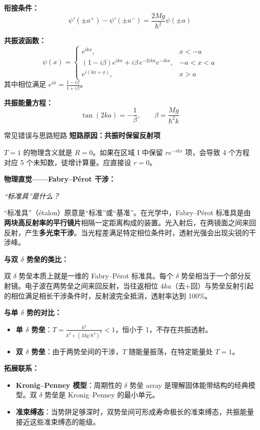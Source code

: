 \begin{formulabox}[核心结论]
\textbf{衔接条件：}
\[
\psi'(\pm a^+) - \psi'(\pm a^-) = \frac{2Mg}{\hbar^2}\psi(\pm a)
\]

\textbf{共振波函数：}
\[
\psi(x) = 
\begin{cases}
e^{ikx}, & x < -a \\
(1-i\beta)e^{ikx} + i\beta\,e^{-2ika}e^{-ikx}, & -a < x < a \\
e^{i(kx+\phi)}, & x > a
\end{cases}
\]
其中相位满足 $\displaystyle e^{i\phi}=\frac{1-i\beta}{1+i\beta}$。

\textbf{共振能量方程：}
\[
\boxed{\tan(2ka) = -\frac{1}{\beta}}, \qquad \beta = \frac{Mg}{\hbar^2 k}
\]
\end{formulabox}

\begin{errorbox}[colback=white]{常见错误与思路短路}
\textbf{短路原因：共振时保留反射项}

$T=1$ 的物理含义就是 $R=0$。如果在区域 I 中保留 $re^{-ikx}$ 项，会导致 4 个方程对应 5 个未知数，徒增计算量。应直接设 $r=0$。
\end{errorbox}

\begin{insightbox}[举一反三与物理直觉]
\textbf{物理直觉——Fabry--P\'erot 干涉：}

\textit{``标准具''是什么？}

``标准具''（\'{e}talon）原意是``标准''或``基准''。在光学中，Fabry--P\'erot 标准具是由\textbf{两块高反射率的平行镜片}相隔一定距离构成的装置。光入射后，在两镜面之间来回反射，产生\textbf{多光束干涉}。当光程差满足特定相位条件时，透射光强会出现尖锐的干涉峰。

\textbf{与双 $\delta$ 势垒的类比：}

双 $\delta$ 势垒本质上就是一维的 Fabry--P\'erot 标准具。每个 $\delta$ 势垒相当于一个部分反射镜。电子波在两势垒之间来回反射，当往返相位 $4ka$（去+回）与势垒反射引起的相位满足相长干涉条件时，反射波完全抵消，透射率达到 100\%。

\textbf{与单 $\delta$ 势的对比：}
\begin{itemize}[nosep]
    \item \textbf{单 $\delta$ 势垒}：$T = \frac{k^2}{k^2+(Mg/\hbar^2)^2} < 1$，恒小于 1，不存在共振透射。
    \item \textbf{双 $\delta$ 势垒}：由于两势垒间的干涉，$T$ 随能量振荡，在特定能量处 $T=1$。
\end{itemize}

\textbf{拓展联系：}
\begin{itemize}[nosep]
    \item \textbf{Kronig--Penney 模型}：周期性的 $\delta$ 势垒 array 是理解固体能带结构的经典模型。双 $\delta$ 势垒是 Kronig--Penney 的最小单元。
    \item \textbf{准束缚态}：当势阱足够深时，双势垒间可形成寿命极长的准束缚态，共振能量接近这些准束缚态的能级。
\end{itemize}
\end{insightbox}


